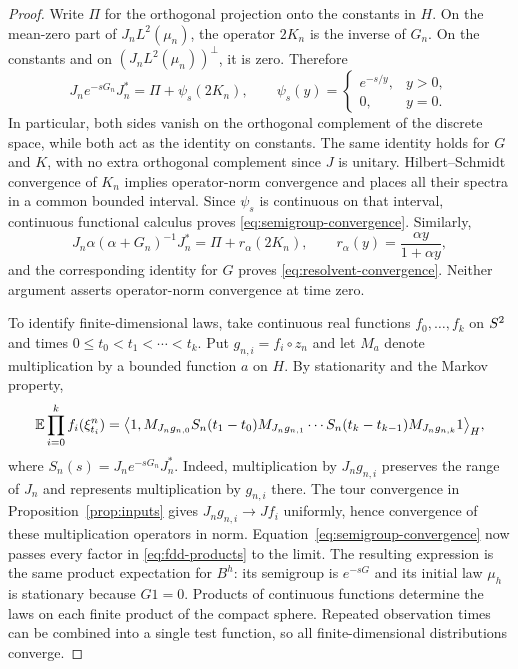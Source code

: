 \begin{proof}
Write $\Pi$ for the orthogonal projection onto the constants in $H$. On the
mean-zero part of $J_nL^2(\mu_n)$, the operator $2K_n$ is the inverse of $G_n$.
On the constants and on $(J_nL^2(\mu_n))^\perp$, it is zero. Therefore
\begin{equation}\label{eq:functional-calculus}
 J_n e^{-sG_n}J_n^*=\Pi+\psi_s(2K_n),
 \qquad
 \psi_s(y)=
 \begin{cases}e^{-s/y},&y>0,\\0,&y=0.\end{cases}
\end{equation}
In particular, both sides vanish on the orthogonal complement of the discrete
space, while both act as the identity on constants. The same identity holds
for $G$ and $K$, with no extra orthogonal complement since $J$ is unitary.
Hilbert--Schmidt convergence of $K_n$ implies operator-norm convergence and
places all their spectra in a common bounded interval. Since $\psi_s$ is
continuous on that interval, continuous functional calculus proves
\eqref{eq:semigroup-convergence}. Similarly,
\[
 J_n\alpha(\alpha+G_n)^{-1}J_n^*
   =\Pi+r_\alpha(2K_n),
 \qquad r_\alpha(y)=\frac{\alpha y}{1+\alpha y},
\]
and the corresponding identity for $G$ proves
\eqref{eq:resolvent-convergence}. Neither argument asserts operator-norm
convergence at time zero.

To identify finite-dimensional laws, take continuous real functions
$f_0,\ldots,f_k$ on $S^2$ and times
$0\le t_0<t_1<\cdots<t_k$. Put $g_{n,i}=f_i\circ z_n$ and let $M_a$ denote
multiplication by a bounded function $a$ on $H$. By stationarity and the
Markov property,
\begin{equation}\label{eq:fdd-products}
 \mathbb E\prod_{i=0}^k f_i(\xi^n_{t_i})
 =\big\langle 1,
 M_{J_ng_{n,0}}S_n(t_1-t_0)M_{J_ng_{n,1}}
 \cdots S_n(t_k-t_{k-1})M_{J_ng_{n,k}}1\big\rangle_H,
\end{equation}
where $S_n(s)=J_ne^{-sG_n}J_n^*$. Indeed, multiplication by $J_ng_{n,i}$
preserves the range of $J_n$ and represents multiplication by $g_{n,i}$ there.
The tour convergence in Proposition~\ref{prop:inputs} gives
$J_ng_{n,i}\to Jf_i$ uniformly, hence convergence of these multiplication
operators in norm. Equation~\eqref{eq:semigroup-convergence} now passes every
factor in \eqref{eq:fdd-products} to the limit. The resulting expression is
the same product expectation for $B^h$: its semigroup is $e^{-sG}$ and its
initial law $\mu_h$ is stationary because $G1=0$. Products of continuous
functions determine the laws on each finite product of the compact sphere.
Repeated observation times can be combined into a single test function, so
all finite-dimensional distributions converge.
\end{proof}

